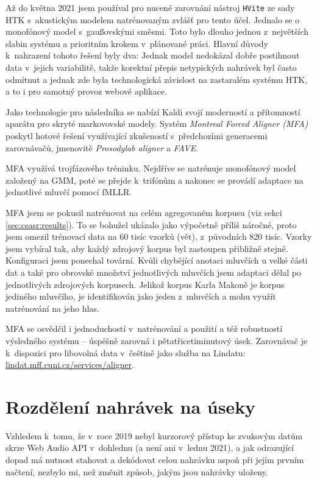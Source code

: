 Až do května 2021 jsem používal pro nucené zarovnání nástroj \texttt{HVite} ze
sady HTK s~akustickým modelem natrénovaným zvlášť pro tento účel. Jednalo se o
monofónový model s~gaußovskými směsmi. Toto bylo dlouho jednou z~největších slabin
systému a prioritním krokem v~plánované práci. Hlavní důvody k~nahrazení tohoto
řešení byly dva: Jednak model nedokázal dobře postihnout data v~jejich
variabilitě, takže korektní přepis netypických nahrávek byl často odmítnut a
jednak zde byla technologická závislost na zastaralém systému HTK, a to i pro
samotný provoz webové aplikace.

Jako technologie pro následníka se nabízí Kaldi svojí moderností a přítomností
aparátu pro skryté markovovské modely. Systém {\em Montreal Forced
Aligner\cite{mcauliffe2017montreal} (MFA)} poskytl hotové řešení využívající
zkušeností s~předchozími generacemi zarovnávačů, jmenovitě {\em Prosodylab
aligner}\cite{gorman2011prosodylab} a {\em FAVE}\cite{rosenfelder2011fave}.

MFA využívá trojfázového tréninku. Nejdříve se natrénuje monofónový model
založený na GMM, poté se přejde k~trifónům a nakonec se provádí adaptace na
jednotlivé mluvčí pomocí fMLLR.

MFA jsem se pokusil natrénovat na celém agregovaném korpusu (viz
sekci \ref{sec:csasr:results}). To se bohužel ukázalo jako výpočetně příliš
náročné, proto jsem omezil trénovací data na 60 tisíc vzorků (vět), z~původních
820 tisíc. Vzorky jsem vybíral tak, aby každý zdrojový korpus byl zastoupen
přibližně stejně.
Konfiguraci jsem ponechal tovární. Kvůli chybějící anotaci mluvčích u velké
části dat a také pro obrovské množství jednotlivých mluvčích jsem adaptaci dělal
po jednotlivých zdrojových korpusech. Jelikož korpus Karla Makoně je korpus
jediného mluvčího, je identifikován jako jeden z~mluvčích a mohu využít
natrénování na jeho hlas.

MFA se osvědčil i jednoduchostí v~natrénování a použití a též robustností
výsledného systému -- úspěšně zarovná i pětatřicetiminutový úsek.
Zarovnávač je k~dispozici pro libovolná data v~češtině jako služba na Lindatu:
\url{lindat.mff.cuni.cz/services/aligner}.

\section{Rozdělení nahrávek na úseky}
\label{sec:segmenty}

Vzhledem k~tomu, že v~roce 2019 nebyl kurzorový přístup ke zvukovým datům
skrze Web Audio API v~dohlednu (a není ani v~lednu 2021), a jak odrazující dopad má nutnost
stahovat a dekódovat celou nahrávku aspoň při jejím prvním načtení, nezbylo mi,
než změnit způsob, jakým jsou nahrávky uloženy. %

